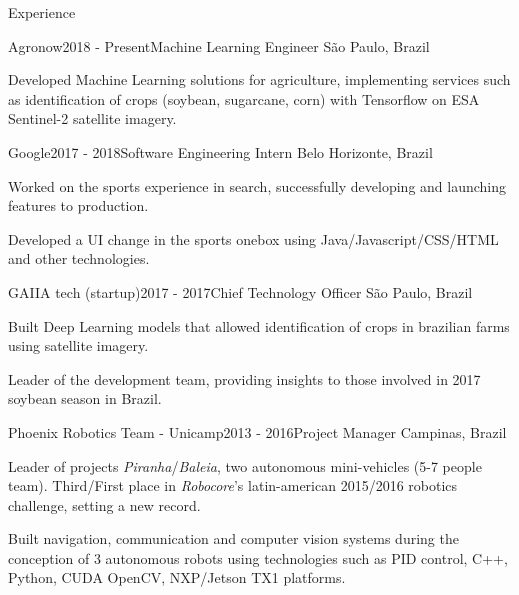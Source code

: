 \documentclass[8pt]{resume}
\newcommand{\tit}[1]{\textit{#1}}
\begin{document}
\begin{rSection}{Experience}

\begin{rSubsection}{Agronow}{2018 - Present}{Machine Learning Engineer}
    {São Paulo, Brazil}
    \item Developed Machine Learning solutions for agriculture, implementing services such as identification of crops (soybean, sugarcane, corn)
        with Tensorflow on ESA Sentinel-2 satellite imagery.
\end{rSubsection}

\begin{rSubsection}{Google}{2017 - 2018}{Software Engineering Intern}
    {Belo Horizonte, Brazil}
    \item Worked on the sports experience in search, successfully developing and launching features to production.
    \item Developed a UI change in the sports onebox using Java/Javascript/CSS/HTML and other technologies.
\end{rSubsection}

\begin{rSubsection}{GAIIA tech (startup)}{2017 - 2017}{Chief Technology Officer}
    {São Paulo, Brazil}
    \item Built Deep Learning models that allowed identification of crops in brazilian farms using satellite imagery.
    \item Leader of the development team, providing insights to
        those involved in 2017 soybean season in Brazil.
\end{rSubsection}

\begin{rSubsection}{Phoenix Robotics Team - Unicamp}{2013 - 2016}{Project Manager}
    {Campinas, Brazil}
\item Leader of projects \tit{Piranha}/\tit{Baleia},
        two autonomous mini-vehicles (5-7 people team).
        Third/First place in \tit{Robocore}'s latin-american 2015/2016 robotics
        challenge, setting a new record.
    \item Built navigation, communication and computer vision systems
        during the conception of 3 autonomous robots using technologies such as PID control, C++, Python, CUDA OpenCV, NXP/Jetson TX1 platforms.
\end{rSubsection}


\end{rSection}
\end{document}
